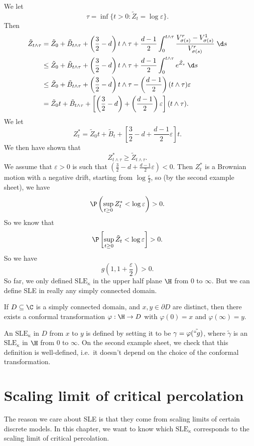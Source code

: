 \documentclass[a4paper]{article}
\newcommand\SLE{\mathrm{SLE}}
\begin{document}
We let
\[
  \tau = \inf \{t > 0 : \tilde{Z}_t = \log \varepsilon\}.
\]
Then
\begin{align*}
  \tilde{Z}_{t \wedge \tau} &= \tilde{Z}_0 + \tilde{B}_{t \wedge \tau} + \left(\frac{3}{2} - d\right) t\wedge \tau  + \frac{d - 1}{2} \int_0^{t \wedge \tau} \frac{V_{\sigma(s)}^r - V_{\sigma(s)}^1}{V_{\sigma(s)}^r}\;\d s\\
  &\leq \tilde{Z}_0 + \tilde{B}_{t \wedge \tau} + \left(\frac{3}{2} - d \right) t \wedge \tau + \frac{d - 1}{2} \int_0^{t \wedge \tau} e^{\tilde{Z}_s}\;\d s\\
  &\leq \tilde{Z}_0 + \tilde{B}_{t \wedge \tau} + \left(\frac{3}{2} - d \right) t \wedge \tau - \left(\frac{d - 1}{2}\right)(t \wedge \tau)\varepsilon\\
  &= \tilde{Z}_0t + \tilde{B}_{t \wedge \tau} + \left[\left(\frac{3}{2} - d\right) + \left(\frac{d - 1}{2}\right)\varepsilon \right] (t \wedge \tau).
\end{align*}
We let
\[
  Z_t^*= \tilde{Z}_0t + \tilde{B}_{t} + \left[\frac{3}{2} - d + \frac{d - 1}{2}\varepsilon \right] t.
\]
We then have shown that
\[
  Z_{t \wedge \tau}^* \geq \tilde{Z}_{t \wedge \tau}.
\]
We assume that $\varepsilon > 0$ is such that $\left(\frac{3}{2} - d + \frac{d - 1}{2} \varepsilon\right) < 0$. Then $Z_t^*$ is a Brownian motion with a negative drift, starting from $\log \frac{\varepsilon}{2}$, so (by the second example sheet), we have
\[
  \P \left(\sup_{t \geq 0} Z_t^* < \log \varepsilon\right) > 0.
\]
So we know that
\[
  \P\left[ \sup_{t \geq 0} \tilde{Z}_t < \log \varepsilon \right] > 0.
\]
So we have
\[
  g\left(1, 1 + \frac{\varepsilon}{2}\right) > 0.
\]
So far, we only defined $\SLE_\kappa$ in the upper half plane $\H$ from $0$ to $\infty$. But we can define SLE in really any simply connected domain.

If $D \subseteq \C$ is a simply connected domain, and $x, y \in \partial D$ are distinct, then there exists a conformal transformation $\varphi: \H \to D$ with $\varphi(0) = x$ and $\varphi(\infty) = y$.

An $\SLE_\kappa$ in $D$ from $x$ to $y$ is defined by setting it to be $\gamma = \varphi(\tilde{``g})$, where $\tilde{\gamma}$ is an $\SLE_\kappa$ in $\H$ from $0$ to $\infty$. On the second example sheet, we check that this definition is well-defined, i.e.\ it doesn't depend on the choice of the conformal transformation. 
\section{Scaling limit of critical percolation}
The reason we care about SLE is that they come from scaling limits of certain discrete models. In this chapter, we want to know which $\SLE_\kappa$ corresponds to the scaling limit of critical percolation.
\end{document}
